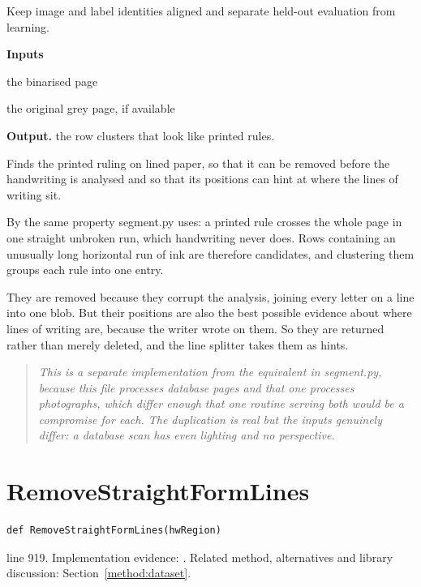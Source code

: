 Keep image and label identities aligned and separate held-out evaluation from learning.




\noindent\textbf{Inputs}
\begin{description}[leftmargin=2.2em,style=nextline,font=\normalfont\ttfamily]\setlength\itemsep{1pt}
  \item[{binaryImg}] \normalfont the binarised page
  \item[{rawGrayscaleArray}] \normalfont the original grey page, if available
\end{description}

\noindent\textbf{Output.} the row clusters that look like printed rules.


Finds the printed ruling on lined paper, so that it can be removed before the handwriting is analysed and so that its positions can hint at where the lines of writing sit.


By the same property segment.py uses: a printed rule crosses the whole page in one straight unbroken run, which handwriting never does. Rows containing an unusually long horizontal run of ink are therefore candidates, and clustering them groups each rule into one entry.


They are removed because they corrupt the analysis, joining every letter on a line into one blob. But their positions are also the best possible evidence about where lines of writing are, because the writer wrote on them. So they are returned rather than merely deleted, and the line splitter takes them as hints.


\begin{quote}\small\itshape This is a separate implementation from the equivalent in segment.py, because this file processes database pages and that one processes photographs, which differ enough that one routine serving both would be a compromise for each. The duplication is real but the inputs genuinely differ: a database scan has even lighting and no perspective.\end{quote}


\section{RemoveStraightFormLines}\label{fn:train:RemoveStraightFormLines}
\begin{lstlisting}[style=sig]
def RemoveStraightFormLines(hwRegion)
\end{lstlisting}
 line 919. Implementation evidence: \cite{code2026}. Related method, alternatives and library discussion: Section~\ref{method:dataset}.


